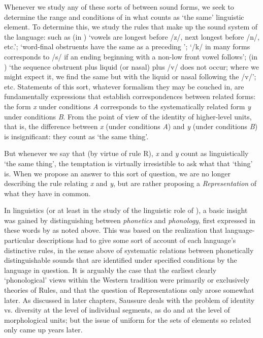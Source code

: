 Whenever we study any of these sorts of  between
sound forms, we seek to determine the range and conditions of
 in what counts as ‘the same' linguistic element. To
determine this, we study the {rules} that make up the sound system of
the language:  such as (in ) ‘vowels are
longest before /z/, next longest before /n/, etc.'; ‘word-final
obstruents have the same  as a preceding '; ‘/k/ in
many forms corresponds to /s/ if an ending beginning with a non-low
front vowel follows'; (in ) ‘the sequence obstruent plus
liquid (or nasal) plus /v/ does not occur; where we might expect it,
we find the same  but with the liquid or nasal following the
/v/'; etc. Statements of this sort, whatever formalism they may be
couched in, are fundamentally expressions that establish
correspondences between related forms: the form \emph{x} under
conditions \emph{A} corresponds to the systematically related form
\emph{y} under conditions \emph{B}. From the point of view of the
identity of higher-level units, that is, the difference between
\emph{x} (under conditions \emph{A}) and \emph{y} (under conditions
\emph{B}) is insignificant: they count as ‘the same thing'.

But whenever we say that (by virtue of rule R), \emph{x} and \emph{y}
count as linguistically ‘the same thing', the temptation is virtually
irresistible to ask what that ‘thing' is. When we propose an answer to
this sort of question, we are no longer describing the rule relating
\emph{x} and \emph{y}, but are rather proposing a
\textit{Representation} of what they have in common.

In linguistics (or at least in the study of the linguistic role of
), a basic insight was gained by distinguishing between
\emph{phonetics} and \emph{phonology}, first expressed in these words
by {\Jespersen} as noted above.  This was based on the realization that
language-particular descriptions had to give some sort of account of
each language's distinctive {rules}, in the sense above of systematic
relations between phonetically distinguishable sounds that are
identified under specified conditions by the language in question.  It
is arguably the case that the earliest clearly `phonological' views
within the Western tradition were primarily or exclusively theories of
Rules, and that the question of Representations only arose somewhat
later.  As discussed in later chapters, Saussure deals with the
problem of identity vs.  diversity at the level of individual
segments, as do {\DeCourtenay} and {\Kruszewski} at the level of
morphological units; but the issue of uniform  for the
sets of elements so related only came up years later.

